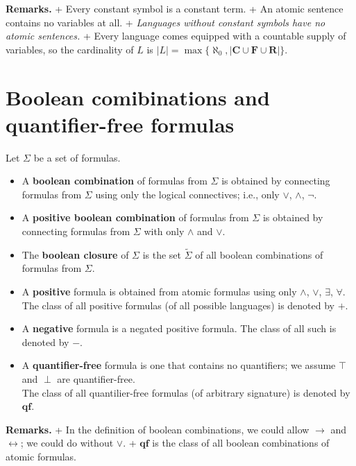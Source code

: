 \documentclass[a4paper,UKenglish,cleveref,autoref,thm-restate,12pt]{lipics-v2021-wjd}
\newcommand{\<}{\langle}
\renewcommand{\>}{\rangle}
\begin{document}
\textbf{Remarks.} + Every constant symbol is a constant term. + An
atomic sentence contains no variables at all. + \emph{Languages without
constant symbols have no atomic sentences.} + Every language comes
equipped with a countable supply of variables, so the cardinality of
\(L\) is
\(|L| = \max \{\aleph_0, |\mathbf C \cup \mathbf F \cup \mathbf R|\}\).


\section{Boolean comibinations and quantifier-free
formulas}\label{boolean-comibinations-and-quantifier-free-formulas}

Let \(\Sigma\) be a set of formulas.

\begin{itemize}
\item
  A \textbf{boolean combination} of formulas from \(\Sigma\) is obtained
  by connecting formulas from \(\Sigma\) using only the logical
  connectives; i.e., only \(\vee\), \(\wedge\), \(\neg\).
\item
  A \textbf{positive boolean combination} of formulas from \(\Sigma\) is
  obtained by connecting formulas from \(\Sigma\) with only \(\wedge\)
  and \(\vee\).
\item
  The \textbf{boolean closure} of \(\Sigma\) is the set
  \(\tilde{\Sigma}\) of all boolean combinations of formulas from
  \(\Sigma\).
\item
  A \textbf{positive} formula is obtained from atomic formulas using
  only \(\wedge\), \(\vee\), \(\exists\), \(\forall\).\\
  The class of all positive formulas (of all possible languages) is
  denoted by \(\boldsymbol{+}\).
\item
  A \textbf{negative} formula is a negated positive formula. The class
  of all such is denoted by \(\boldsymbol{-}\).
\item
  A \textbf{quantifier-free} formula is one that contains no
  quantifiers; we assume \(\top\) and \(\perp\) are quantifier-free.\\
  The class of all quantilier-free formulas (of arbitrary signature) is
  denoted by \(\mathbf{qf}\).
\end{itemize}

\textbf{Remarks.} + In the definition of boolean combinations, we could
allow \(\to\) and \(\leftrightarrow\); we could do without \(\vee\). +
\(\mathbf{qf}\) is the class of all boolean combinations of atomic
formulas.
\end{document}
